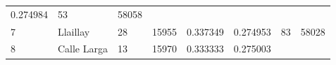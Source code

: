 \documentclass[]{article}
\begin{document}
\begin{longtable}[]{@{}llllllll@{}}
\begin{minipage}[t]{0.09\columnwidth}
0.274984\strut
\end{minipage} & \begin{minipage}[t]{0.11\columnwidth}\raggedright
53\strut
\end{minipage} & \begin{minipage}[t]{0.10\columnwidth}\raggedright
58058\strut
\end{minipage}\tabularnewline
\begin{minipage}[t]{0.03\columnwidth}\raggedright
7\strut
\end{minipage} & \begin{minipage}[t]{0.09\columnwidth}\raggedright
Llaillay\strut
\end{minipage} & \begin{minipage}[t]{0.14\columnwidth}\raggedright
28\strut
\end{minipage} & \begin{minipage}[t]{0.13\columnwidth}\raggedright
15955\strut
\end{minipage} & \begin{minipage}[t]{0.10\columnwidth}\raggedright
0.337349\strut
\end{minipage} & \begin{minipage}[t]{0.09\columnwidth}\raggedright
0.274953\strut
\end{minipage} & \begin{minipage}[t]{0.11\columnwidth}\raggedright
83\strut
\end{minipage} & \begin{minipage}[t]{0.10\columnwidth}\raggedright
58028\strut
\end{minipage}\tabularnewline
\begin{minipage}[t]{0.03\columnwidth}\raggedright
8\strut
\end{minipage} & \begin{minipage}[t]{0.09\columnwidth}\raggedright
Calle Larga\strut
\end{minipage} & \begin{minipage}[t]{0.14\columnwidth}\raggedright
13\strut
\end{minipage} & \begin{minipage}[t]{0.13\columnwidth}\raggedright
15970\strut
\end{minipage} & \begin{minipage}[t]{0.10\columnwidth}\raggedright
0.333333\strut
\end{minipage} & \begin{minipage}[t]{0.09\columnwidth}\raggedright
0.275003\strut
\end{minipage} & \begin{minipage}[t]{0.11\columnwidth}\raggedright

\end{minipage}
\end{longtable}
\end{document}
